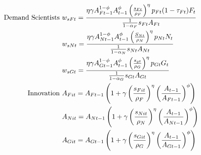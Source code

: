 \begin{align}
\text{Demand Scientists}\ \vspace{4mm}&
w_{sFt}=\frac{\eta \gamma A_{Ft-1}^{1-\phi}A_{t-1}^{\phi}\left(\frac{s_{Ft}}{\rho_F}\right)^{\eta}p_{Ft}(1-\tau_{Ft})F_t}{\frac{1}{1-\alpha_F}s_{Ft}A_{Ft}}\nonumber\\
&
w_{sNt}=\frac{\eta \gamma  A_{Nt-1}^{1-\phi}A_{t-1}^{\phi}\left(\frac{S_{Nt}}{\rho_N}\right)^{\eta}p_{Nt}N_t}{\frac{1}{1-\alpha_N}s_{Nt}A_{Nt}}\nonumber\\
&
w_{sGt}=\frac{\eta \gamma  A_{Gt-1}^{1-\phi}A_{t-1}^{\phi}\left(\frac{s_{gt}}{\rho_G}\right)^{\eta}p_{Gt}G_t}{\frac{1}{1-\alpha_G}s_{Gt}A_{Gt}}\nonumber\\
\text{Innovation}\ \vspace{4mm}&
A_{Fit}=A_{Ft-1}\left(1+\gamma\left(\frac{s_{Fit}}{\rho_F}\right)^{\eta}\left(\frac{A_{t-1}}{A_{Ft-1}}\right)^{\phi}\right)\nonumber \\
&
A_{Nit}=A_{Nt-1}\left(1+\gamma\left(\frac{s_{Nit}}{\rho_N}\right)^{\eta}\left(\frac{A_{t-1}}{A_{Nt-1}}\right)^{\phi}\right)\nonumber \\
&
A_{Git}=A_{Gt-1}\left(1+\gamma\left(\frac{s_{Git}}{\rho_G}\right)^{\eta}\left(\frac{A_{t-1}}{A_{Gt-1}}\right)^{\phi}\right)\nonumber \\

\end{align}
